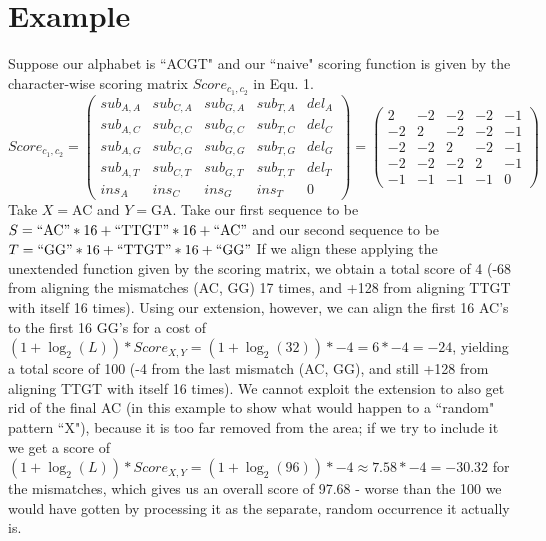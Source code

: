 \documentclass[english, 11pt]{article}
\begin{document}
\section*{Example}
Suppose our alphabet is ``ACGT" and our ``naive" scoring function is given by the character-wise scoring matrix $Score_{c_1, c_2}$ in Equ. 1.
\begin{equation}
	Score_{c_1, c_2} = 
		\begin{pmatrix}
			sub_{A,A} & sub_{C,A} & sub_{G,A} & sub_{T,A} & del_{A} \\
			sub_{A,C} & sub_{C,C} & sub_{G,C} & sub_{T,C} & del_{C} \\
			sub_{A,G} & sub_{C,G} & sub_{G,G} & sub_{T,G} & del_{G} \\
			sub_{A,T} & sub_{C,T} & sub_{G,T} & sub_{T,T} & del_{T} \\
			ins_{A} & ins_{C} & ins_{G} & ins_{T} & 0 
		\end{pmatrix} = 
		\begin{pmatrix}
			2 & -2 & -2 & -2 & -1 \\
			-2 & 2 & -2 & -2 & -1 \\
			-2 & -2 & 2 & -2 & -1 \\
			-2 & -2 & -2 & 2 & -1 \\
			-1 & -1 & -1 & -1 & 0
		\end{pmatrix}
\end{equation}
Take $X=$AC and $Y=$GA.
Take our first sequence to be $S = ``\text{AC}"*16+``\text{TTGT}"*16+``\text{AC}"$  and our second sequence to be  $T = ``\text{GG}"*16+``\text{TTGT}"*16+``\text{GG}"$
If we align these applying the unextended function given by the scoring matrix, we obtain a total score of 4 (-68 from aligning the mismatches (AC, GG) 17 times, and +128 from aligning TTGT with itself 16 times). 
Using our extension, however, we can align the first 16 AC's to the first 16 GG's for a cost of $(1+\log_2(L))*Score_{X,Y} = (1 + \log_2(32))*-4 = 6*-4 = -24$, yielding a total score of 100 (-4 from the last mismatch (AC, GG), and still +128 from aligning TTGT with itself 16 times). 
We cannot exploit the extension to also get rid of the final AC (in this example to show what would happen to a ``random" pattern ``X"), because it is too far removed from the area; if we try to include it we get a score of $(1+\log_2(L))*Score_{X,Y} = (1 + \log_2(96))*-4 \approx 7.58*-4 = -30.32$ for the mismatches, which gives us an overall score of 97.68 - worse than the 100 we would have gotten by processing it as the separate, random occurrence it actually is.
\end{document}
